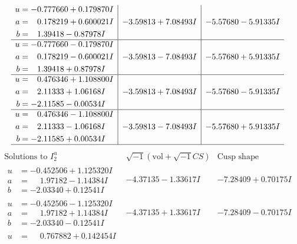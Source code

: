 \documentclass[1p]{elsarticle_modified}
\theoremstyle{definition}
\newcommand{\I}{\sqrt{-1}}
\begin{document}
$$\begin{array}{c|c|c}
\begin{aligned}
u &= -0.777660 + 0.179870 I \\
a &= \phantom{-}0.178219 + 0.600021 I \\
b &= \phantom{-}1.39418 - 0.87978 I\end{aligned}
 & -3.59813 + 7.08493 I & -5.57680 - 5.91335 I \\ \hline\begin{aligned}
u &= -0.777660 - 0.179870 I \\
a &= \phantom{-}0.178219 - 0.600021 I \\
b &= \phantom{-}1.39418 + 0.87978 I\end{aligned}
 & -3.59813 - 7.08493 I & -5.57680 + 5.91335 I \\ \hline\begin{aligned}
u &= \phantom{-}0.476346 + 1.108800 I \\
a &= \phantom{-}2.11333 + 1.06168 I \\
b &= -2.11585 - 0.00534 I\end{aligned}
 & -3.59813 + 7.08493 I & -5.57680 - 5.91335 I \\ \hline\begin{aligned}
u &= \phantom{-}0.476346 - 1.108800 I \\
a &= \phantom{-}2.11333 - 1.06168 I \\
b &= -2.11585 + 0.00534 I\end{aligned}
 & -3.59813 - 7.08493 I & -5.57680 + 5.91335 I\\
 \hline 
 \end{array}$$\newpage$$\begin{array}{c|c|c}  
\text{Solutions to }I^u_{2}& \I (\text{vol} + \sqrt{-1}CS) & \text{Cusp shape}\\
 \hline 
\begin{aligned}
u &= -0.452506 + 1.125320 I \\
a &= \phantom{-}1.97182 - 1.14384 I \\
b &= -2.03340 + 0.12541 I\end{aligned}
 & -4.37135 - 1.33617 I & -7.28409 + 0.70175 I \\ \hline\begin{aligned}
u &= -0.452506 - 1.125320 I \\
a &= \phantom{-}1.97182 + 1.14384 I \\
b &= -2.03340 - 0.12541 I\end{aligned}
 & -4.37135 + 1.33617 I & -7.28409 - 0.70175 I \\ \hline\begin{aligned}
u &= \phantom{-}0.767882 + 0.142454 I \\

\end{aligned}
\end{array}$$
\end{document}
